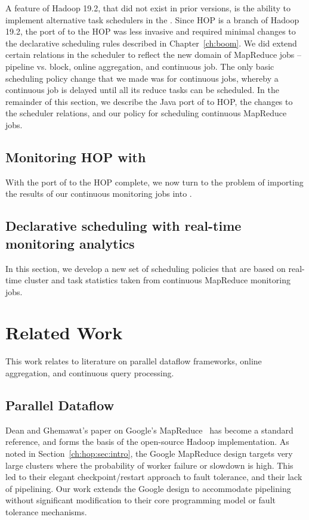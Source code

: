 A feature of Hadoop 19.2, that did not exist in prior versions, is the ability to implement alternative task schedulers
in the \JT. Since HOP is a branch of Hadoop 19.2, the port of \JOL to the HOP \JT was less invasive and required 
minimal changes to the declarative scheduling rules described in Chapter~\ref{ch:boom}. We did extend certain
relations in the scheduler to reflect the new domain of MapReduce jobs -- pipeline vs. block, online aggregation, 
and continuous job. The only basic scheduling policy change that we made was for continuous jobs, whereby
a continuous job is delayed until all its reduce tasks can be scheduled. In the remainder of this section, we describe
the Java port of \JOL to HOP, the changes to the scheduler relations, and our policy for scheduling continuous MapReduce
jobs.


\subsection{Monitoring HOP with \JOL}
\label{ch:hop:sec:jolmonitor}

With the port of \JOL to the HOP \JT complete, we now turn to the problem of importing the
results of our continuous monitoring jobs into \JOL. 

\subsection{Declarative scheduling with real-time monitoring analytics}
\label{ch:hop:sec:declarative}

In this section, we develop a new set of scheduling policies that are based on real-time cluster and task statistics 
taken from continuous MapReduce monitoring jobs.


\section{Related Work}
\label{ch:hop:sec:relwork}
This work relates to literature on parallel dataflow frameworks, online aggregation, and continuous query processing.

\subsection{Parallel Dataflow}
Dean and Ghemawat's paper on Google's MapReduce~\cite{mapreduce-osdi}
has become a standard reference, and forms the basis of the
open-source Hadoop implementation.  As noted in
Section~\ref{ch:hop:sec:intro}, the Google MapReduce design targets very
large clusters where the probability of worker failure or slowdown is
high.  This led to their elegant checkpoint/restart approach to fault
tolerance, and their lack of pipelining.  Our work
extends the Google design to accommodate pipelining without significant
modification to their core programming model or fault tolerance
mechanisms.

